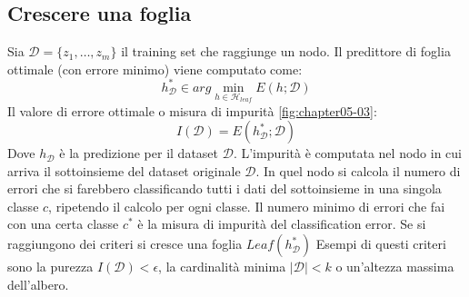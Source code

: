 	\subsection{Crescere una foglia}
	Sia $\mathcal{D}=\{z_1, \dots, z_m\}$ il training set che raggiunge un nodo.
	Il predittore di foglia ottimale (con errore minimo) viene computato come:
	$$h^*_\mathcal{D}\in arg\min\limits_{h\in\mathcal{H}_{leaf}} E(h; \mathcal{D})$$
	Il valore di errore ottimale o misura di impurit\`a \ref{fig:chapter05-03}:
	$$I(\mathcal{D}) = E(h^*_\mathcal{D};\mathcal{D})$$
	Dove $h_\mathcal{D}$ \`e la predizione per il dataset $\mathcal{D}$.
	L'impurit\`a \`e computata nel nodo in cui arriva il sottoinsieme del dataset originale $\mathcal{D}$.
	In quel nodo si calcola il numero di errori che si farebbero classificando tutti i dati del sottoinsieme in una singola classe $c$, ripetendo il calcolo per ogni classe.
	Il numero minimo di errori che fai con una certa classe $c^*$ \`e la misura di impurit\`a del classification error.
	Se si raggiungono dei criteri si cresce una foglia $Leaf(h^*_\mathcal{D})$
	Esempi di questi criteri sono la purezza $I(\mathcal{D}) < \epsilon$, la cardinalit\`a minima $|\mathcal{D}|<k$ o un'altezza massima dell'albero.
	
